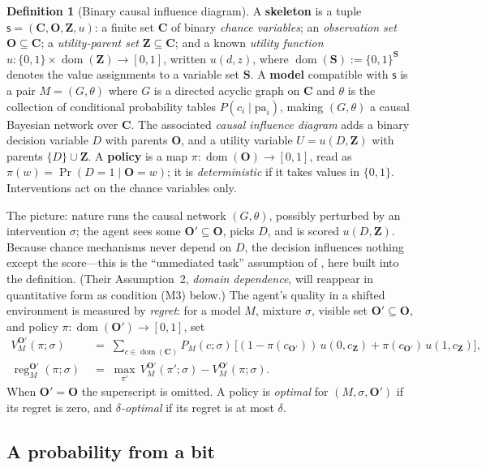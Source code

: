 \documentclass[11pt]{amsart}
\theoremstyle{plain}
\theoremstyle{definition}
\newtheorem{definition}[theorem]{Definition}
\DeclareMathOperator{\dom}{dom}
\DeclareMathOperator{\reg}{reg}
\newcommand{\bC}{\mathbf{C}}
\newcommand{\bO}{\mathbf{O}}
\newcommand{\bZ}{\mathbf{Z}}
\newcommand{\sk}{\mathsf{s}}
\begin{document}
\begin{definition}[Binary causal influence diagram]\label{def:cid}
A \textbf{skeleton} is a tuple $\sk=(\bC,\bO,\bZ,u)$: a finite set $\bC$ of binary \emph{chance variables}; an \emph{observation set} $\bO\subseteq\bC$; a \emph{utility-parent set} $\bZ\subseteq\bC$; and a known \emph{utility function} $u\colon\{0,1\}\times\dom(\bZ)\to[0,1]$, written $u(d,z)$, where $\dom(\mathbf{S}):=\{0,1\}^{\mathbf{S}}$ denotes the value assignments to a variable set $\mathbf{S}$. A \textbf{model} compatible with $\sk$ is a pair $M=(G,\theta)$ where $G$ is a directed acyclic graph on $\bC$ and $\theta$ is the collection of conditional probability tables $P(c_i\mid \mathrm{pa}_i)$, making $(G,\theta)$ a causal Bayesian network over $\bC$. The associated \emph{causal influence diagram} adds a binary decision variable $D$ with parents $\bO$, and a utility variable $U=u(D,\bZ)$ with parents $\{D\}\cup\bZ$. A \textbf{policy} is a map $\pi\colon \dom(\bO)\to[0,1]$, read as $\pi(w)=\Pr(D=1\mid \bO=w)$; it is \emph{deterministic} if it takes values in $\{0,1\}$. Interventions act on the chance variables only.
\end{definition}

The picture: nature runs the causal network $(G,\theta)$, possibly perturbed by an intervention $\sigma$; the agent sees some $\bO'\subseteq\bO$, picks $D$, and is scored $u(D,\bZ)$. Because chance mechanisms never depend on $D$, the decision influences nothing except the score---this is the ``unmediated task'' assumption of \cite{richens2024}, here built into the definition. (Their Assumption~2, \emph{domain dependence}, will reappear in quantitative form as condition (M3) below.) The agent's quality in a shifted environment is measured by \emph{regret}: for a model $M$, mixture $\sigma$, visible set $\bO'\subseteq\bO$, and policy $\pi\colon\dom(\bO')\to[0,1]$, set
\begin{align*}
   V_M^{\bO'}(\pi;\sigma)\;&=\;\sum_{c\in\dom(\bC)} P_M(c;\sigma)\,\bigl[(1-\pi(c_{\bO'}))\,u(0,c_\bZ)+\pi(c_{\bO'})\,u(1,c_\bZ)\bigr],\\
   \reg_M^{\bO'}(\pi;\sigma)\;&=\;\max_{\pi'}\,V_M^{\bO'}(\pi';\sigma)-V_M^{\bO'}(\pi;\sigma).
\end{align*}
When $\bO'=\bO$ the superscript is omitted. A policy is \emph{optimal} for $(M,\sigma,\bO')$ if its regret is zero, and \emph{$\delta$-optimal} if its regret is at most $\delta$.

\subsection{A probability from a bit}\label{subsec:bit}
\end{document}
